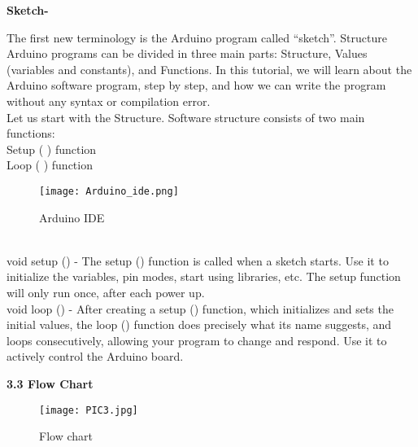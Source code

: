 \documentclass[a4paper,12pt, English]{article}
\begin{document}
\begin{normalsize}
\begin{large}
\textbf{Sketch-}
\end{large}
The first new terminology is the Arduino program called
“sketch”. Structure Arduino programs can be divided in three main parts:
Structure, Values (variables and constants), and Functions. In this tutorial,
we will learn about the Arduino software program, step by step, and how
we can write the program without any syntax or compilation error.\\
Let us start with the Structure. Software structure consists of two main
functions:\\
 Setup ( ) function\\
 Loop ( ) function\\
 \begin{figure}[htb]
\begin{center}
\texttt{[image: Arduino\_ide.png]}
\end{center}
\begin{center}
\renewcommand{\thefigure}{3. 2. 8}
\caption{\footnotesize Arduino IDE}
\end{center}
\end{figure}\\
\newline
void setup () - The setup () function is called when a sketch starts. Use it to
initialize the variables, pin modes, start using libraries, etc. The setup
function will only run once, after each power up.\\
void loop () - After creating a setup () function, which initializes and sets
the initial values, the loop () function does precisely what its name
suggests, and loops consecutively, allowing your program to change and
respond. Use it to actively control the Arduino board.\\
\newpage
\begin{large}
\textbf{3.3 Flow Chart }
\end{large}
\begin{figure}[htb]
\begin{center}
\texttt{[image: PIC3.jpg]}
\end{center}
\begin{center}
\renewcommand{\thefigure}{3. 3. 1}
\caption{\footnotesize Flow chart}
\end{center}
\end{figure}\\

\newpage

\begin{center}

\end{center}
\end{normalsize}
\end{document}
